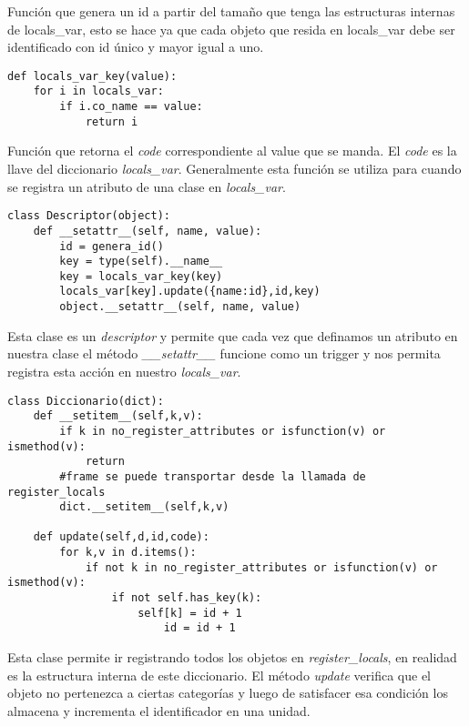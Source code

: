 \documentclass[10pt,a4paper]{article}
\begin{document}
Función que genera un id a partir del tamaño que tenga las estructuras internas de locals\_var, esto se hace ya que cada objeto que resida en locals\_var debe ser identificado con id único y mayor igual a uno.

\begin{verbatim}
def locals_var_key(value):
    for i in locals_var:
        if i.co_name == value:
            return i
\end{verbatim}

Función que retorna el \textit{code} correspondiente al value que se manda. El \textit{code} es la llave del diccionario \textit{locals\_var}. Generalmente esta función se utiliza para cuando se registra un atributo de una clase en \textit{locals\_var}.

\begin{verbatim}
class Descriptor(object):
    def __setattr__(self, name, value):
        id = genera_id()
        key = type(self).__name__
        key = locals_var_key(key)
        locals_var[key].update({name:id},id,key)
        object.__setattr__(self, name, value)
\end{verbatim}

Esta clase es un \textit{descriptor} y permite que cada vez que definamos un atributo en nuestra clase el método \textit{\_\_setattr\_\_} funcione como un trigger y nos permita registra esta acción en nuestro \textit{locals\_var}.

\begin{verbatim}
class Diccionario(dict):
    def __setitem__(self,k,v):
        if k in no_register_attributes or isfunction(v) or ismethod(v):
            return
        #frame se puede transportar desde la llamada de register_locals
        dict.__setitem__(self,k,v)

    def update(self,d,id,code):
        for k,v in d.items():
            if not k in no_register_attributes or isfunction(v) or ismethod(v):
                if not self.has_key(k):
                    self[k] = id + 1
                        id = id + 1

\end{verbatim}

Esta clase permite ir registrando todos los objetos en \textit{register\_locals}, en realidad es la estructura interna de este diccionario. El método \textit{update} verifica que el objeto no pertenezca a ciertas categorías y luego de satisfacer esa condición los almacena y incrementa el identificador en una unidad.
\end{document}
